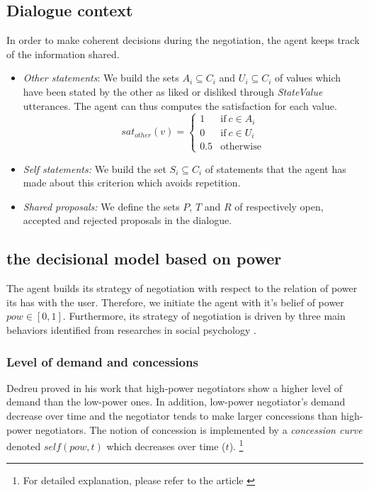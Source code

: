\documentclass[runningheads,a4paper]{llncs}
\begin{document}
	\subsection{Dialogue context}
	In order to make coherent decisions during the negotiation, the agent keeps track of the information shared. 
	\begin{itemize}
		\item \emph{Other statements}: We build the sets $A_i\subseteq C_i$ and $U_i\subseteq C_i$ of values which have been stated by the other as liked or disliked through \emph{StateValue} utterances. The agent can thus computes the satisfaction for each value.
		\vspace{-0.5em} 
		\begin{equation}
		sat_{other}(v)= \left\{\begin{array}{ll}
		1	 & \mathrm{if\ }  c \in A_i\\
		0    & \mathrm{if\ }c \in U_i\\
		0.5	 & \mathrm{otherwise}
		\end{array}\right.
		\end{equation}
		\vspace{-0.5em} 
		\item \emph{Self statements:} We build the set $S_i \subseteq C_i$ of statements that the agent has made about this criterion which avoids repetition.
		
		\item \emph{Shared proposals:} We define the sets $P$, $T$ and $R$ of respectively open, accepted and rejected proposals in the dialogue.
		
	\end{itemize}
	
	\subsection{the decisional model based on power}
	
	The agent builds its strategy of negotiation with respect to the relation of power its has with the user. Therefore, we initiate the agent with it's belief of power $pow \in [0,1]$. Furthermore, its strategy of negotiation is driven by three main behaviors identified from researches in social psychology \cite{de1995impact,fiske1993controlling,magee2007power,de2004influence}. 
	\vspace{-0.5em} 
	\subsubsection{Level of demand and concessions}
	Dedreu proved in his work \cite{de1995impact} that high-power negotiators show a higher level of demand than the low-power ones. In addition, low-power negotiator's demand decrease over time and the negotiator tends to make larger concessions than high-power negotiators. 
	The notion of concession is implemented by a \emph{concession curve} denoted  $self(pow, t)$ which decreases over time ($t$). \footnote{For detailed explanation, please refer to the article \cite{ouali2017computational}}
	
\end{document}

